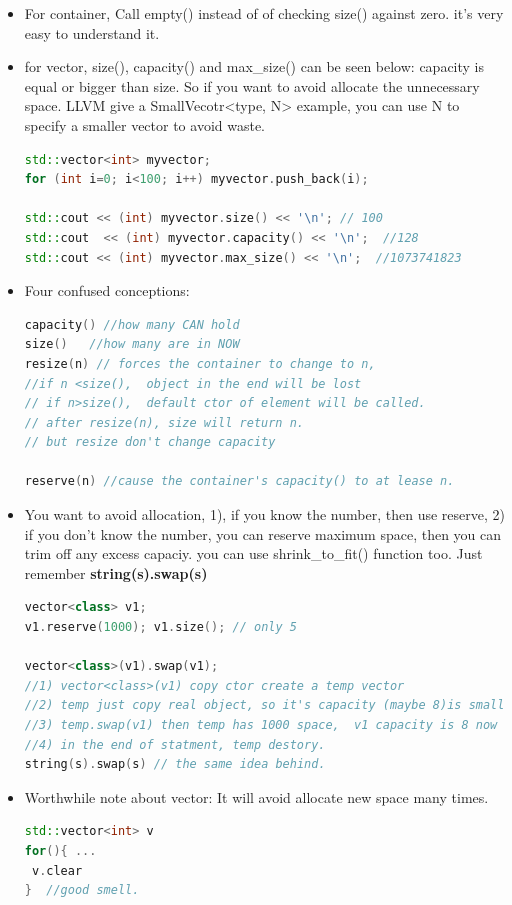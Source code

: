 \documentclass[a4paper,12pt,twoside]{book}
\begin{document}
\begin{itemize}
\item For container, Call empty() instead of of checking size() against zero. it's very easy to understand it.

\item for vector, size(), capacity() and max\_size() can be seen below: capacity is equal or bigger than size. So if you want to avoid allocate the unnecessary space.  LLVM give a SmallVecotr<type, N> example, you can use N to specify a smaller vector to avoid waste.
\begin{lstlisting}[frame=single, language=c++]
std::vector<int> myvector;
for (int i=0; i<100; i++) myvector.push_back(i);

std::cout << (int) myvector.size() << '\n'; // 100
std::cout  << (int) myvector.capacity() << '\n';  //128
std::cout << (int) myvector.max_size() << '\n';  //1073741823
\end{lstlisting}


\item Four confused conceptions:
\begin{lstlisting}[frame=single, language=c++]
capacity() //how many CAN hold
size()   //how many are in NOW
resize(n) // forces the container to change to n,
//if n <size(),  object in the end will be lost
// if n>size(),  default ctor of element will be called.
// after resize(n), size will return n.
// but resize don't change capacity

reserve(n) //cause the container's capacity() to at lease n.
\end{lstlisting}

\item You want to avoid allocation, 1), if you know the number, then use reserve, 2) if you don't know the number, you can reserve maximum space, then you can trim off any excess capaciy.  you can use shrink\_to\_fit() function too. Just remember \textbf{string(s).swap(s)}
\begin{lstlisting}[frame=single, language=c++]
vector<class> v1;
v1.reserve(1000); v1.size(); // only 5

vector<class>(v1).swap(v1);
//1) vector<class>(v1) copy ctor create a temp vector
//2) temp just copy real object, so it's capacity (maybe 8)is small.
//3) temp.swap(v1) then temp has 1000 space,  v1 capacity is 8 now
//4) in the end of statment, temp destory.
string(s).swap(s) // the same idea behind.
\end{lstlisting}

\item Worthwhile note about vector: It will avoid allocate new space many times.
\begin{lstlisting}[frame=single, language=c++]
std::vector<int> v
for(){ ...
 v.clear
}  //good smell.


\end{lstlisting}
\end{itemize}
\end{document}
